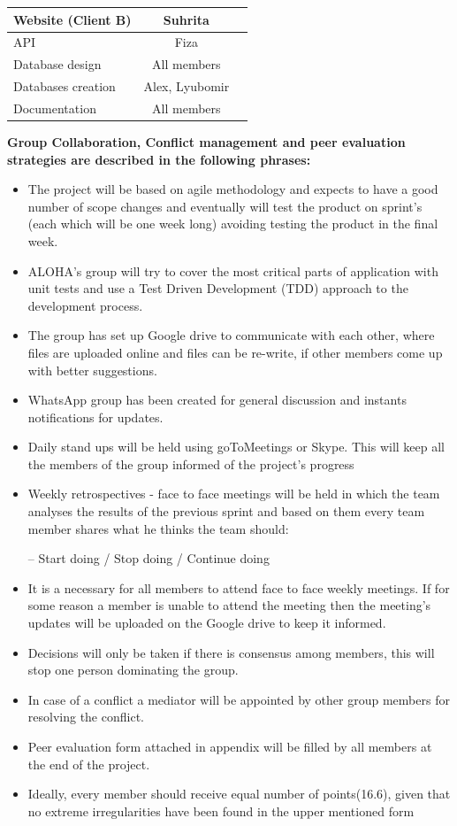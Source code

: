 \documentclass[12pt]{article}
\begin{document}
\begin{table}[!ht]
\centering
\smallskip
\begin{tabular}{l c c}
\hline
Website (Client B) & Suhrita \\[0.5ex]
\hline
API & Fiza \\[0.5ex]
\hline
Database design & All members \\[0.5ex]
\hline
Databases creation & Alex, Lyubomir \\[0.5ex]
\hline
Documentation & All members \\[0.5ex]
\hline
\end{tabular}
\end{table}
\textbf{Group Collaboration, Conflict management and peer evaluation strategies are described in the following phrases:}

\begin{itemize}
    \item The project will be based on agile methodology and expects to have a good number of scope changes and eventually will test the product on sprint's (each which will be one week long) avoiding testing the product in the final week.
    \item ALOHA’s group will try to cover the most critical parts of application with unit tests and use a Test Driven Development (TDD) approach to the development process.
    \item The group has set up Google drive to communicate with each other, where files are uploaded online and files can be re-write, if other members come up with better suggestions. 
    \item WhatsApp group has been created for general discussion and instants notifications for updates.
    \item Daily stand ups will be held using goToMeetings or Skype. This will keep all the members of the group informed of the project’s progress 
    \item Weekly retrospectives - face to face meetings will be held in which the team analyses the results of the previous sprint and based on them every team member shares what he thinks the team should:
        \item[--] Start doing / Stop doing / Continue doing
    \item It is a necessary for all members to attend face to face weekly meetings. If for some reason a member is unable to attend the meeting then the meeting’s updates will be uploaded on the Google drive to keep it informed.  
    \item Decisions will only be taken if there is consensus among members, this will stop one person dominating the group.
    \item In case of a conflict a mediator will be appointed by other group members for resolving the conflict.
    \item Peer evaluation form attached in appendix will be filled by all members at the end of the project.
    \item Ideally, every member should receive equal number of points(16.6), given that no extreme irregularities have been found in the upper mentioned form
\end{itemize}
\end{document}

